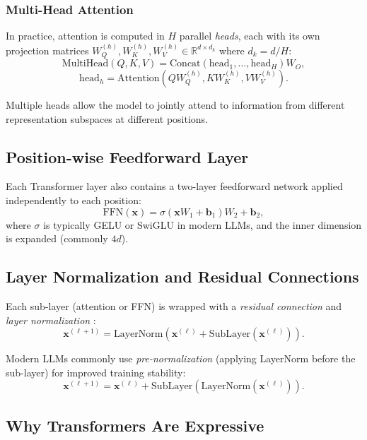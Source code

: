 \documentclass[11pt,a4paper]{article}
\theoremstyle{definition}
\theoremstyle{plain}
\newcommand{\R}{\mathbb{R}}
\begin{document}
\subsubsection{Multi-Head Attention}

In practice, attention is computed in $H$ parallel \emph{heads}, each with
its own projection matrices $W_Q^{(h)}, W_K^{(h)}, W_V^{(h)} \in \R^{d \times d_k}$
where $d_k = d/H$:
\[
  \mathrm{MultiHead}(Q, K, V)
  = \mathrm{Concat}\!\left(\mathrm{head}_1, \dots, \mathrm{head}_H\right) W_O,
\]
\[
  \mathrm{head}_h = \mathrm{Attention}\!\left(QW_Q^{(h)}, KW_K^{(h)}, VW_V^{(h)}\right).
\]

Multiple heads allow the model to jointly attend to information from different
representation subspaces at different positions.

\subsection{Position-wise Feedforward Layer}

Each Transformer layer also contains a two-layer feedforward network applied
independently to each position:
\[
  \mathrm{FFN}(\mathbf{x}) = \sigma\!\left(\mathbf{x} W_1 + \mathbf{b}_1\right) W_2 + \mathbf{b}_2,
\]
where $\sigma$ is typically GELU \cite{hendrycks2016gelu} or SwiGLU \cite{shazeer2020glu}
in modern LLMs, and the inner dimension is expanded (commonly $4d$).

\subsection{Layer Normalization and Residual Connections}

Each sub-layer (attention or FFN) is wrapped with a \emph{residual connection}
and \emph{layer normalization} \cite{ba2016layer}:
\[
  \mathbf{x}^{(\ell+1)} = \mathrm{LayerNorm}\!\left(\mathbf{x}^{(\ell)} + \mathrm{SubLayer}\!\left(\mathbf{x}^{(\ell)}\right)\right).
\]

Modern LLMs commonly use \emph{pre-normalization} (applying LayerNorm before
the sub-layer) for improved training stability:
\[
  \mathbf{x}^{(\ell+1)} = \mathbf{x}^{(\ell)} + \mathrm{SubLayer}\!\left(\mathrm{LayerNorm}\!\left(\mathbf{x}^{(\ell)}\right)\right).
\]

\subsection{Why Transformers Are Expressive}
\end{document}

